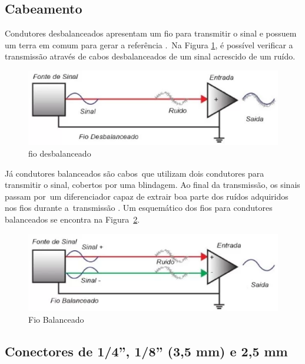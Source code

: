 \subsection{Cabeamento}

Condutores desbalanceados apresentam um fio para transmitir o sinal e possuem um terra em comum para gerar a referência \cite{bartlett}. Na Figura \ref{fig12}, é possível verificar a transmissão através de cabos desbalanceados de um sinal acrescido de um ruído.

\begin{figure}[h]
	\centering
    \includegraphics[scale=0.4]{figuras/fig11.eps}
	\caption{fio desbalanceado \cite{proaudiospQualDiferena}}
	\label{fig12}
\end{figure}

Já condutores balanceados são cabos que utilizam dois condutores para transmitir o sinal, cobertos por uma blindagem. Ao final da transmissão, os sinais passam por um diferenciador capaz de extrair boa parte dos ruídos adquiridos nos fios durante a transmissão \cite{bartlett}. Um esquemático dos fios para condutores balanceados se encontra na Figura \ref{fig11}.

\begin{figure}[h]
	\centering
    \includegraphics[scale=0.4]{figuras/fig12.eps}
	\caption{Fio Balanceado \cite{proaudiospQualDiferena}}
	\label{fig11}
\end{figure}

\subsection{Conectores de 1/4”, 1/8” (3,5 mm) e 2,5 mm}

